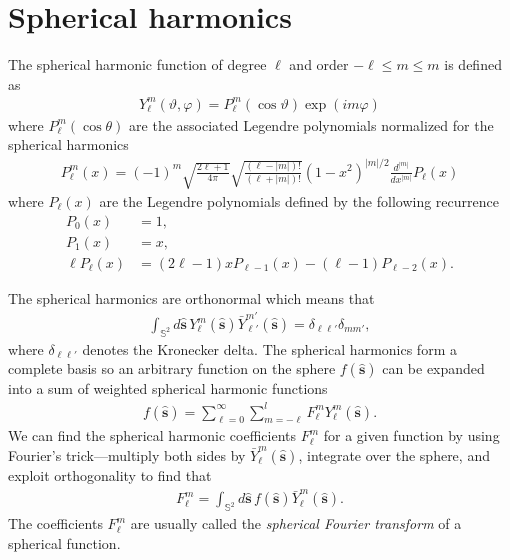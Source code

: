 \documentclass{osa-article}
\providecommand{\mh}[1]{\mathbf{\hat{#1}}}
\providecommand{\mbb}[1]{\mathbb{#1}}
\begin{document}
\section{Spherical harmonics}\label{sec:sph}
The spherical harmonic function of degree $\ell$ and order $-\ell \leq m \leq m$
is defined as \cite{schaeffer2013}
\begin{align}
Y_\ell^m(\vartheta, \varphi) = P_\ell^m\left(\cos\vartheta\right)\exp(i m \varphi)
\end{align}
where $P_\ell^m(\cos\theta)$ are the associated Legendre polynomials normalized for the
spherical harmonics 
\begin{align}
  P_\ell^m(x) = (-1)^m\sqrt{\frac{2\ell+1}{4\pi}}\sqrt{\frac{(\ell-|m|)!}{(\ell+|m|)!}}(1-x^2)^{|m|/2}\frac{d^{|m|}}{dx^{|m|}}P_\ell(x)
\end{align}
where $P_\ell(x)$ are the Legendre polynomials defined by the following recurrence
\begin{align}
  P_0(x) &= 1,\\
  P_1(x) &= x,\\
  \ell P_\ell(x) &= (2\ell-1)xP_{\ell-1}(x) - (\ell-1)P_{\ell-2}(x). 
\end{align}

The spherical harmonics are orthonormal which means that
\begin{align}
  \int_{\mbb{S}^2}d\mh{s}\, Y_\ell^m(\mh{s})\bar{Y}_{\ell'}^{m'}(\mh{s}) = \delta_{\ell\ell'}\delta_{mm'},
\end{align}
where $\delta_{\ell\ell'}$ denotes the Kronecker delta. The spherical harmonics form a
complete basis so an arbitrary function on the sphere $f(\mh{s})$ can be
expanded into a sum of weighted spherical harmonic functions
\begin{align}
  f(\mh{s}) = \sum_{\ell=0}^{\infty}\sum_{m=-\ell}^{l}F_\ell^mY_\ell^m(\mh{s}).
\end{align}
We can find the spherical harmonic coefficients $F_\ell^m$ for a given function by
using Fourier's trick---multiply both sides by $\bar{Y}_\ell^m(\mh{s})$, integrate
over the sphere, and exploit orthogonality to find that
\begin{align}
  F_\ell^m = \int_{\mbb{S}^2}d\mh{s}\, f(\mh{s})\bar{Y}_\ell^m(\mh{s}).
\end{align}
The coefficients $F_\ell^m$ are usually called the \textit{spherical Fourier
  transform} of a spherical function.
\end{document}
